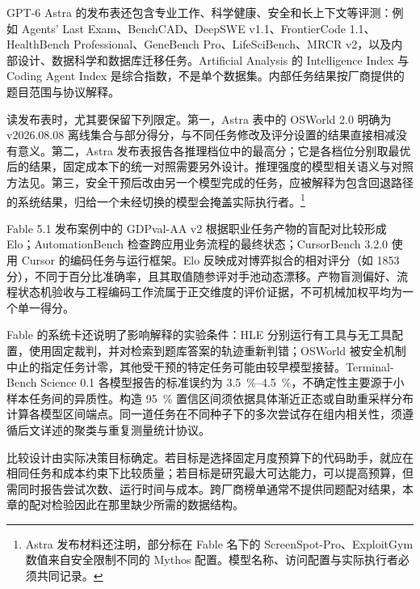 \documentclass[../textbook.tex]{subfiles}
\begin{document}
GPT-6 Astra 的发布表还包含专业工作、科学健康、安全和长上下文等评测：例如 Agents' Last Exam、BenchCAD、DeepSWE v1.1、FrontierCode 1.1、HealthBench Professional、GeneBench Pro、LifeSciBench、MRCR v2，以及内部设计、数据科学和数据库迁移任务。Artificial Analysis 的 Intelligence Index 与 Coding Agent Index 是综合指数，不是单个数据集。内部任务结果按厂商提供的题目范围与协议解释\cite{openai2026astralaunch}。

读发布表时，尤其要保留下列限定。第一，Astra 表中的 OSWorld 2.0 明确为 v2026.08.08 离线集合与部分得分，与不同任务修改及评分设置的结果直接相减没有意义。第二，Astra 发布表报告各推理档位中的最高分；它是各档位分别取最优后的结果，固定成本下的统一对照需要另外设计。推理强度的模型相关语义与对照方法见。第三，安全干预后改由另一个模型完成的任务，应被解释为包含回退路径的系统结果，归给一个未经切换的模型会掩盖实际执行者。\footnote{Astra 发布材料还注明，部分标在 Fable 名下的 ScreenSpot-Pro、ExploitGym 数值来自安全限制不同的 Mythos 配置。模型名称、访问配置与实际执行者必须共同记录。}\cite{openai2026astralaunch}

Fable 5.1 发布案例中的 GDPval-AA v2 根据职业任务产物的盲配对比较形成 Elo；AutomationBench 检查跨应用业务流程的最终状态；CursorBench 3.2.0 使用 Cursor 的编码任务与运行框架。Elo 反映成对博弈拟合的相对评分（如 1853 分），不同于百分比准确率，且其取值随参评对手池动态漂移。产物盲测偏好、流程状态机验收与工程编码工作流属于正交维度的评价证据，不可机械加权平均为一个单一得分\cite{anthropic2026fable51card}。

Fable 的系统卡还说明了影响解释的实验条件：HLE 分别运行有工具与无工具配置，使用固定裁判，并对检索到题库答案的轨迹重新判错；OSWorld 被安全机制中止的指定任务计零，其他受干预的特定任务可能由较早模型接替。Terminal-Bench Science 0.1 各模型报告的标准误约为 \qtyrange{3.5}{4.5}{\percent}，不确定性主要源于小样本任务间的异质性。构造 \qty{95}{\percent} 置信区间须依据具体渐近正态或自助重采样分布计算各模型区间端点\cite{anthropic2026fable51card}。同一道任务在不同种子下的多次尝试存在组内相关性，须遵循后文详述的聚类与重复测量统计协议。

比较设计由实际决策目标确定。若目标是选择固定月度预算下的代码助手，就应在相同任务和成本约束下比较质量；若目标是研究最大可达能力，可以提高预算，但需同时报告尝试次数、运行时间与成本。跨厂商榜单通常不提供同题配对结果，本章的配对检验因此在那里缺少所需的数据结构。
\end{document}
